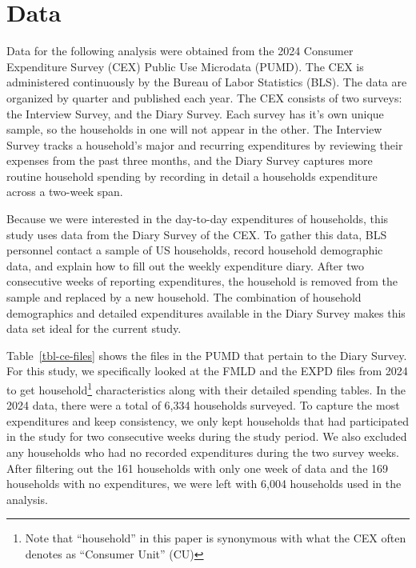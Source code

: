 \documentclass[
]{agujournal2019}
\begin{document}
\section{Data}\label{data}

Data for the following analysis were obtained from the 2024 Consumer
Expenditure Survey (CEX) Public Use Microdata (PUMD). The CEX is
administered continuously by the Bureau of Labor Statistics (BLS). The
data are organized by quarter and published each year. The CEX consists
of two surveys: the Interview Survey, and the Diary Survey. Each survey
has it's own unique sample, so the households in one will not appear in
the other. The Interview Survey tracks a household's major and recurring
expenditures by reviewing their expenses from the past three months, and
the Diary Survey captures more routine household spending by recording
in detail a households expenditure across a two-week span.

Because we were interested in the day-to-day expenditures of households,
this study uses data from the Diary Survey of the CEX. To gather this
data, BLS personnel contact a sample of US households, record household
demographic data, and explain how to fill out the weekly expenditure
diary. After two consecutive weeks of reporting expenditures, the
household is removed from the sample and replaced by a new household.
The combination of household demographics and detailed expenditures
available in the Diary Survey makes this data set ideal for the current
study.

Table~\ref{tbl-ce-files} shows the files in the PUMD that pertain to the
Diary Survey. For this study, we specifically looked at the FMLD and the
EXPD files from 2024 to get household\footnote{Note that ``household''
  in this paper is synonymous with what the CEX often denotes as
  ``Consumer Unit'' (CU)} characteristics along with their detailed
spending tables. In the 2024 data, there were a total of 6,334
households surveyed. To capture the most expenditures and keep
consistency, we only kept households that had participated in the study
for two consecutive weeks during the study period. We also excluded any
households who had no recorded expenditures during the two survey weeks.
After filtering out the 161 households with only one week of data and
the 169 households with no expenditures, we were left with 6,004
households used in the analysis.
\end{document}
